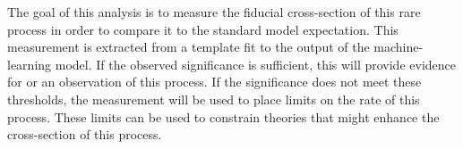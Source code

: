 The goal of this analysis is to measure the fiducial cross-section of this rare
process in order to compare it to the standard model expectation.
This measurement is extracted from a template fit to the output of the
machine-learning model. %
If the observed significance is sufficient, this will provide evidence for or an
observation of this process. If the significance does not meet these thresholds,
the measurement will be used to place limits on the rate of this process. These
limits can be used to constrain theories that might enhance the cross-section of
this process.


